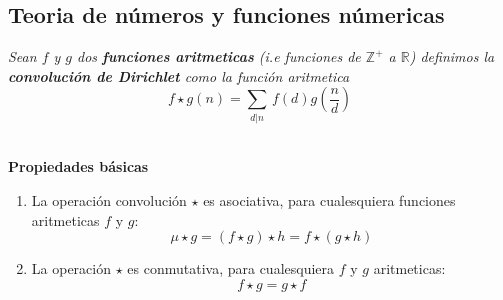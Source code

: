 \documentclass[11pt,letterpaper]{article}
\newcommand{\R}{\mathbb{R}}
\newcommand{\Z}{\mathbb{Z}}
\begin{document}
\subsection{Teoria de n\'umeros y funciones n\'umericas}
\begin{tcolorbox}[  
    colback=CINVESTAV!10,   %
    colframe=CINVESTAV,     %
    title=\textcolor{white}{Definici\'on}
]
\textit{Sean $f$ y $g$ dos \textbf{funciones aritmeticas} (i.e funciones de $\Z^{+}$ a $\R$) definimos la \textbf{convoluci\'on de Dirichlet} como la funci\'on aritmetica \,\\ 
\begin{equation*}
    f\star g(n)=\sum_{d|n}\,f(d)g\left(\frac{n}{d}\right)
\end{equation*}}
\par\noindent\dotfill \,\\
\textbf{Propiedades b\'asicas}
\begin{enumerate}
    \item La operaci\'on convoluci\'on $\star$ es asociativa, para cualesquiera funciones aritmeticas $f$ y $g$:
    \begin{equation*}
       \mu\star g=(f\star g)\star h=f\star(g\star h)
    \end{equation*}
    \item La operaci\'on $\star$ es conmutativa, para cualesquiera $f$ y $g$ aritmeticas:
    \begin{equation*}
        f\star g=g\star f
    \end{equation*}
\end{enumerate}
\end{tcolorbox}
\end{document}
